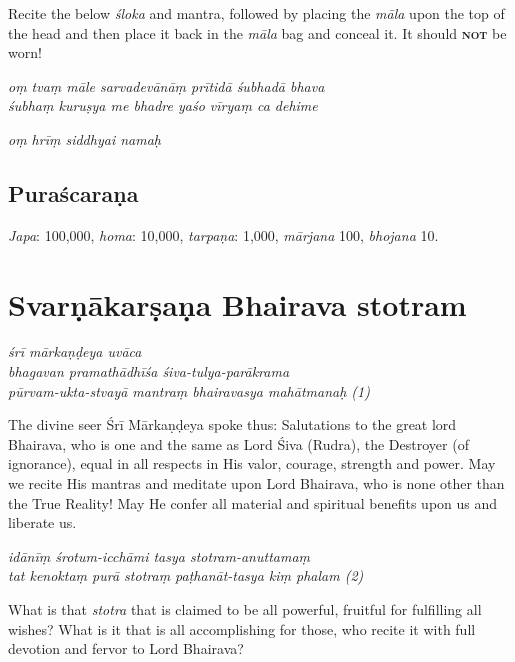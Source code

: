 \documentclass[11pt,oneside,a4paper]{article}
\newenvironment{shloka}[1]
  {\bigskip\center#1\varwidth{\linewidth}}
  {\endvarwidth\endcenter\bigskip}
\newcommand{\tl}[1]{\emph{#1}}
\begin{document}
Recite the below \tl{śloka} and mantra, followed by placing the \tl{māla} upon
the top of the head and then place it back in the \tl{māla} bag and conceal it.
It should \textsc{\textbf{not}} be worn!

\begin{shloka}\itshape
  oṃ tvaṃ māle sarvadevānāṃ prītidā śubhadā bhava\\
  śubhaṃ kuruṣya me bhadre yaśo vīryaṃ ca dehime
\end{shloka}

\begin{shloka}\itshape
  oṃ hrīṃ siddhyai namaḥ
\end{shloka}

\subsection{Puraścaraṇa}

\tl{Japa}: 100,000, \tl{homa}: 10,000, \tl{tarpaṇa}: 1,000, \tl{mārjana} 100,
\tl{bhojana} 10.
\clearpage

\section{Svarṇākarṣaṇa Bhairava stotram}

\begin{shloka}\itshape
  śrī mārkaṇḍeya uvāca\\
  bhagavan pramathādhīśa śiva-tulya-parākrama\\
  pūrvam-ukta-stvayā mantraṃ bhairavasya mahātmanaḥ (1)
\end{shloka}

The divine seer Śrī Mārkaṇḍeya spoke thus: Salutations to the great lord
Bhairava, who is one and the same as Lord Śiva (Rudra), the Destroyer (of
ignorance), equal in all respects in His valor, courage, strength and power.
May we recite His mantras and meditate upon Lord Bhairava, who is none other
than the True Reality! May He confer all material and spiritual benefits upon
us and liberate us.

\begin{shloka}\itshape
  idānīṃ śrotum-icchāmi tasya stotram-anuttamaṃ\\
  tat kenoktaṃ purā stotraṃ paṭhanāt-tasya kiṃ phalam (2)
\end{shloka}

What is that \tl{stotra} that is claimed to be all powerful, fruitful for
fulfilling all wishes? What is it that is all accomplishing for those, who
recite it with full devotion and fervor to Lord Bhairava?
\end{document}
